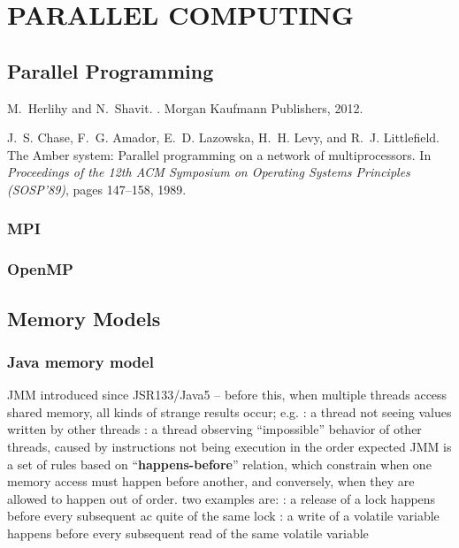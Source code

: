 \documentclass{myproc}
\begin{document}
\section{PARALLEL COMPUTING}
\subsection{Parallel Programming}
\bit
\w M.~Herlihy and N.~Shavit.
.
\newblock Morgan Kaufmann Publishers, 2012.

\w J.~S. Chase, F.~G. Amador, E.~D. Lazowska, H.~H. Levy, and R.~J. Littlefield.
\newblock The Amber system: Parallel programming on a network of
  multiprocessors.
\newblock In {\em Proceedings of the 12th ACM Symposium on Operating Systems
  Principles (SOSP'89)}, pages 147--158, 1989.
\eit

\subsubsection{\textcolor{red2}{\bf{}MPI}}

\subsubsection{OpenMP}

\subsection{Memory Models}
\subsubsection{Java memory model}
\bit
\w JMM introduced since JSR133/Java5 -- before this, when multiple threads access
shared memory, all kinds of strange results occur; e.g.
  \bit
  \w {}: a thread not seeing values written by other
  threads 
  \w {}: a thread observing ``impossible''
  behavior of other threads, caused by instructions not being execution in the
  order expected
  \eit
\w JMM is a set of rules based on
``\textcolor{red2}{\textbf{happens-before}}'' relation, which constrain when
one memory access must happen before another, and conversely, when they are
allowed to happen out of order. two examples are:
   \bit
   \w {}: a release of a lock happens before every
   subsequent ac quite of the same lock
   \w {}: a write of a volatile variable happens
   before every subsequent read of the same volatile variable
   \eit
\eit
\end{document}

